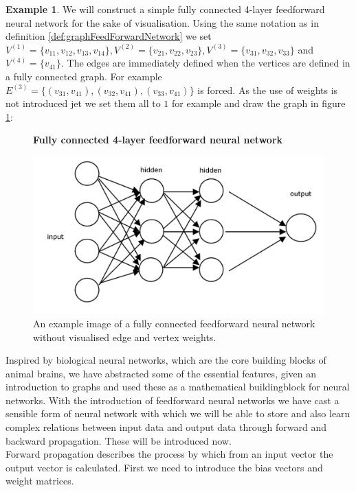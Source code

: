 \documentclass{article}
\theoremstyle{definition}
\newtheorem{example}[theorem]{Example}
\newcommand*{\figuretitle}[1]{%
    {\centering%
    \textbf{#1}%
    \par\medskip}%
}
\begin{document}
\begin{example}
We will construct a simple fully connected 4-layer feedforward neural network for the sake of visualisation. Using the same notation as in definition \ref{def:graphFeedForwardNetwork} we set $V^{(1)}=\{v_{11}, v_{12}, v_{13}, v_{14}\}, V^{(2)}=\{v_{21}, v_{22}, v_{23}\}, V^{(3)}=\{v_{31}, v_{32}, v_{33}\}$ and $V^{(4)}=\{v_{41}\}$. The edges are immediately defined when the vertices are defined in a fully connected graph. For example $E^{(3)}=\{(v_{31}, v_{41}), (v_{32}, v_{41}), (v_{33}, v_{41})\}$ is forced. As the use of weights is not introduced jet we set them all to $1$ for example and draw the graph in figure \ref{fig:4LayerNetwork}: 
\begin{figure}[H]
\centering
\figuretitle{Fully connected 4-layer feedforward neural network}
\includegraphics[scale=0.85]{graphics/MultiLayerNeuralNetwork.png}
\caption{An example image of a fully connected feedforward neural network without visualised edge and vertex weights\cite{neuralNetwork2020}.} 
\label{fig:4LayerNetwork}
\end{figure}

\end{example}

Inspired by biological neural networks, which are the core building blocks of animal brains, we have abstracted some of the essential features, given an introduction to graphs and used these as a mathematical buildingblock for neural networks.
With the introduction of feedforward neural networks we have cast a sensible form of neural network with which we will be able to store and also learn complex relations between input data and output data through forward and backward propagation. These will be introduced now.\\
Forward propagation describes the process by which from an input vector the output vector is calculated. First we need to introduce the bias vectors and weight matrices.
\end{document}
